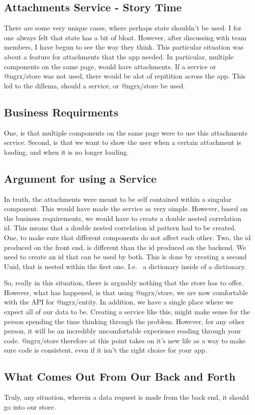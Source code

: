 \subsection{ Attachments Service - Story Time }
There are some very unique cases, where perhaps state shouldn't be used. I for
one always felt that state has a bit of bloat. However, after discussing with
team members, I have begun to see the way they think. This particular situation
was about a feature for attachments that the app needed. In particular,
multiple components on the same page, would have attachments. If a service or
@ngrx/store was not used, there would be alot of repitition across the app. This
led to the dillema, should a service, or @ngrx/store be used.

\subsection{ Business Requirments }
One, is that multiple components on the same page were to use this attachments
service. Second, is that we want to show the user when a certain attachment is
loading, and when it is no longer loading.

\subsection{ Argument for using a Service }
In truth, the attachments were meant to be self contained within a singular
component. This would have made the service as very simple. However, based on
the business requirements, we would have to create a double nested correlation
id. This means that a double nested correlation id pattern had to be created.
One, to make sure that different components do not affect each other. Two, the
id produced on the front end, is different than the id produced on the backend.
We need to create an id that can be used by both. This is done by creating a
second Uuid, that is nested within the first one. I.e. \ a dictionary inside of a
dictionary.

So, really in this situation, there is arguably nothing that the store has to
offer. However, what has happened, is that using @ngrx/store, we are now
comfortable with the API for @ngrx/entity. In addition, we have a single place
where we expect all of our data to be. Creating a service like this, might make
sense for the person spending the time thinking through the problem. However,
for any other person, it will be an incredibly uncomfortable experience reading
through your code. @ngrx/store therefore at this point takes on it's new life
as a way to make sure code is consistent, even if it isn't the right choice for
your app.

\subsection{ What Comes Out From Our Back and Forth }
Truly, any situation, wherein a data request is made from the back end, it
should go into our store.
